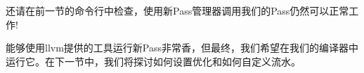 \begin{enumerate}
	\begin{tcolorbox}[colback=blue!5!white,colframe=blue!75!black, title=Tip]
		还请在前一节的命令行中检查，使用新Pass管理器调用我们的Pass仍然可以正常工作!
	\end{tcolorbox}
	
\end{enumerate}

能够使用llvm提供的工具运行新Pass非常香，但最终，我们希望在我们的编译器中运行它。在下一节中，我们将探讨如何设置优化和如何自定义流水。\par






